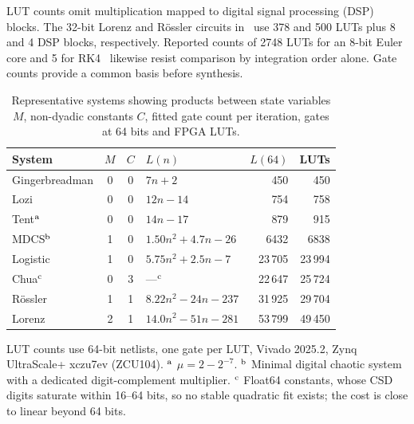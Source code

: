 \documentclass[ASNA,twocolumn]{USG}
\begin{document}
LUT counts omit multiplication mapped to digital signal processing (DSP) blocks.
The 32-bit Lorenz and R\"ossler circuits in~\cite{jauhari2023} use 378 and 500 LUTs
plus 8 and 4 DSP blocks, respectively. Reported counts of 2748 LUTs for an 8-bit
Euler core and 5 for RK4~\cite{damaj2024} likewise resist comparison by integration
order alone. Gate counts provide a common basis before synthesis.

\begin{table}[t]
\caption{Representative systems showing products between state variables $M$, non-dyadic constants
$C$, fitted gate count per iteration, gates at 64 bits and FPGA LUTs.\label{tab:systems}}
\centering
\footnotesize
\setlength{\tabcolsep}{3pt}
\begin{tabular}{@{}lcclrr@{}}
\toprule
System & $M$ & $C$ & $L(n)$ & $L(64)$ & LUTs\\
\midrule
Gingerbreadman      & 0 & 0 & $7n + 2$                & 450     & 450\\
Lozi~\cite{lozi1978} & 0 & 0 & $12n - 14$              & 754     & 758\\
Tent$^{\rm a}$      & 0 & 0 & $14n - 17$              & 879     & 915\\
MDCS$^{\rm b}$      & 1 & 0 & $1.50n^2 + 4.7n - 26$   & 6432    & 6838\\
Logistic            & 1 & 0 & $5.75n^2 + 2.5n - 7$    & 23\,705 & 23\,994\\
Chua$^{\rm c}$      & 0 & 3 & ---$^{\rm c}$ & 22\,647 & 25\,724\\
R\"ossler~\cite{rossler1976} & 1 & 1 & $8.22n^2 - 24n - 237$   & 31\,925 & 29\,704\\
Lorenz~\cite{lorenz1963} & 2 & 1 & $14.0n^2 - 51n - 281$   & 53\,799 & 49\,450\\
\bottomrule
\end{tabular}
\par\smallskip
\parbox{\columnwidth}{\scriptsize LUT counts use 64-bit netlists, one gate per LUT, Vivado 2025.2,
Zynq UltraScale+ xczu7ev (ZCU104).
$^{\rm a}$ $\mu = 2 - 2^{-7}$.
$^{\rm b}$ Minimal digital chaotic system~\cite{nepomuceno2019} with a dedicated digit-complement multiplier.
$^{\rm c}$ Float64 constants, whose CSD digits saturate within 16--64 bits, so no stable
quadratic fit exists; the cost is close to linear beyond 64 bits.}
\end{table}
\end{document}

